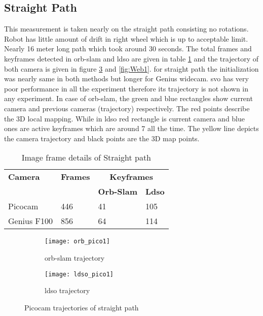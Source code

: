 \subsection{Straight Path}
This measurement is taken nearly on the straight path consisting no rotations. Robot has little amount of drift in right wheel which is up to acceptable limit. Nearly 16 meter long path which took around 30 seconds. The total frames and keyframes detected in \acrshort{orb}-\acrshort{slam} and \acrshort{ldso} are given in table \ref{table:straight} and the trajectory of both camera is given in figure \ref{fig:Pico1} and \ref{fig:Web1}. for straight path the initialization was nearly same in both methods but longer for Genius widecam. \acrshort{svo} has very poor performance in all the experiment therefore its trajectory is not shown in any experiment. In case of \acrshort{orb}-\acrshort{slam}, the green and blue rectangles show current camera and previous cameras (trajectory) respectively. The red points describe the 3D local mapping. While in \acrshort{ldso} red rectangle is current camera and blue ones are active keyframes which are around 7 all the time. The yellow line depicts the camera trajectory and black points are the 3D map points.\\
\begin{table}[H]
	\centering
	\renewcommand{\arraystretch}{1.5}
	\begin{tabular}{ l| l| l |l }
		\textbf{Camera} & \textbf{Frames} & \multicolumn{2}{c}{\textbf{Keyframes}}  \\    
		&      & \textbf{Orb-Slam}  & \textbf{Ldso}  \\
		\hline
		Picocam & 446 &  41  & 105 \\ 
		\hline
		Genius F100 & 856 &  64  & 114 \\ 
	\end{tabular}
	\caption{Image frame details of Straight path}
	\label{table:straight}
\end{table}
\begin{figure}[H]
	\begin{subfigure}{.5\textwidth}
		\centering
		\texttt{[image: orb\_pico1]}
		\caption{\acrshort{orb}-\acrshort{slam} trajectory}
		\label{fig:orb_pico1}
	\end{subfigure}%
	\begin{subfigure}{.5\textwidth}
		\centering
		\texttt{[image: ldso\_pico1]}
		\caption{\acrshort{ldso} trajectory}
		\label{fig:ldso_pico1}
	\end{subfigure}
	\caption{Picocam trajectories of straight path}
	\label{fig:Pico1}
\end{figure}
